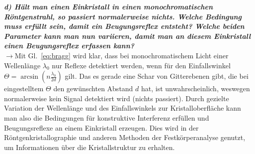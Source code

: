 \textbf{\textit{d) Hält man einen Einkristall in einen monochromatischen Röntgenstrahl,
so passiert normalerweise nichts. Welche Bedingung muss erfüllt sein, damit
ein Beugungsreflex entsteht? Welche beiden Parameter kann man nun
variieren, damit man an diesem Einkristall einen Beugungsreflex erfassen
kann?}}\\
$\rightarrow$Mit Gl.~\eqref{eq:bragg} wird klar, dass bei monochromatischem Licht einer Wellenlänge
$\lambda_{0}$ nur Reflexe detektiert werden, wenn für den 
Einfallswinkel $\Theta = \arcsin(n\frac{\lambda_{0}}{2d})$ gilt. Das es gerade eine Schar von Gitterebenen 
gibt, die bei eingestelltem $\Theta$ den gewünschten Abstand $d$ hat, ist unwahrscheinlich, weswegen 
normalerweise kein Signal detektiert wird (nichts passiert).
Durch gezielte Variation der Wellenlänge und des Einfallswinkels zur Kristalloberfläche 
kann man also die Bedingungen für konstruktive Interferenz erfüllen und Beugungsreflexe 
an einem Einkristall erzeugen. 
Dies wird in der Röntgenkristallographie und anderen Methoden der Festkörperanalyse genutzt, 
um Informationen über die Kristallstruktur zu erhalten.
